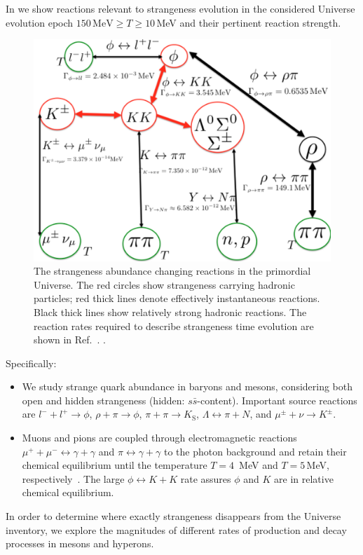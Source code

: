 In  we show reactions relevant to strangeness evolution in the considered Universe evolution epoch $150\,\mathrm{MeV}\ge T\ge 10$\,MeV  and their pertinent reaction strength. 
\begin{figure}  
\centerline{\includegraphics[width=0.9\linewidth]{./plots/Strangeness002_newJ.jpg}}
\caption{The strangeness abundance changing reactions in the primordial Universe. The red circles show strangeness carrying hadronic particles; red thick lines denote effectively instantaneous reactions. Black thick lines show relatively strong hadronic reactions. The reaction rates required to describe  strangeness time evolution are shown in Ref.~\cite{Rafelski:2020ajx}. . }
\label{Strangeness_map2} 
\end{figure}
Specifically:
\begin{itemize}
\item
We study strange quark abundance in baryons and mesons, considering both open and hidden strangeness (hidden: $s\bar s$-content). Important source reactions are $l^-+l^+\rightarrow\phi$, $\rho+\pi\rightarrow\phi$, $\pi+\pi\rightarrow K_\mathrm{S}$, $\Lambda \leftrightarrow \pi+ N$, and $\mu^\pm+\nu\rightarrow K^\pm$. 
\item
Muons and pions are coupled through electromagnetic reactions $\mu^++\mu^-\leftrightarrow\gamma+\gamma$ and $\pi\leftrightarrow\gamma+\gamma$ to the photon background and retain their chemical equilibrium until the temperature $T =4$\, MeV and $T=5$\,MeV, respectively~\cite{Rafelski:2021aey,Kuznetsova:2008jt}. The large $\phi\leftrightarrow K+K$ rate assures $\phi$ and $K$ are in relative chemical equilibrium.
\end{itemize}
In order to determine where exactly strangeness disappears from the Universe inventory, we explore the magnitudes of different rates of production and decay processes in mesons and hyperons.
 


